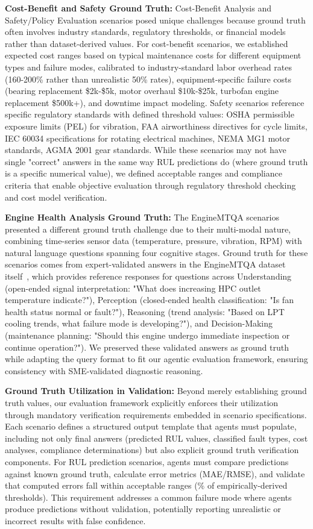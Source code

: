 \documentclass[sigconf]{acmart}
\begin{document}
\textbf{Cost-Benefit and Safety Ground Truth:} Cost-Benefit Analysis and Safety/Policy Evaluation scenarios posed unique challenges because ground truth often involves industry standards, regulatory thresholds, or financial models rather than dataset-derived values. For cost-benefit scenarios, we established expected cost ranges based on typical maintenance costs for different equipment types and failure modes, calibrated to industry-standard labor overhead rates (160-200\% rather than unrealistic 50\% rates), equipment-specific failure costs (bearing replacement \$2k-\$5k, motor overhaul \$10k-\$25k, turbofan engine replacement \$500k+), and downtime impact modeling. Safety scenarios reference specific regulatory standards with defined threshold values: OSHA permissible exposure limits (PEL) for vibration, FAA airworthiness directives for cycle limits, IEC 60034 specifications for rotating electrical machines, NEMA MG1 motor standards, AGMA 2001 gear standards. While these scenarios may not have single "correct" answers in the same way RUL predictions do (where ground truth is a specific numerical value), we defined acceptable ranges and compliance criteria that enable objective evaluation through regulatory threshold checking and cost model verification.

\textbf{Engine Health Analysis Ground Truth:} The EngineMTQA scenarios presented a different ground truth challenge due to their multi-modal nature, combining time-series sensor data (temperature, pressure, vibration, RPM) with natural language questions spanning four cognitive stages. Ground truth for these scenarios comes from expert-validated answers in the EngineMTQA dataset itself~\cite{lei2024itformer}, which provides reference responses for questions across Understanding (open-ended signal interpretation: "What does increasing HPC outlet temperature indicate?"), Perception (closed-ended health classification: "Is fan health status normal or fault?"), Reasoning (trend analysis: "Based on LPT cooling trends, what failure mode is developing?"), and Decision-Making (maintenance planning: "Should this engine undergo immediate inspection or continue operation?"). We preserved these validated answers as ground truth while adapting the query format to fit our agentic evaluation framework, ensuring consistency with SME-validated diagnostic reasoning.

\textbf{Ground Truth Utilization in Validation:} Beyond merely establishing ground truth values, our evaluation framework explicitly enforces their utilization through mandatory verification requirements embedded in scenario specifications. Each scenario defines a structured output template that agents must populate, including not only final answers (predicted RUL values, classified fault types, cost analyses, compliance determinations) but also explicit ground truth verification components. For RUL prediction scenarios, agents must compare predictions against known ground truth, calculate error metrics (MAE/RMSE), and validate that computed errors fall within acceptable ranges (\% of empirically-derived thresholds). This requirement addresses a common failure mode where agents produce predictions without validation, potentially reporting unrealistic or incorrect results with false confidence.
\end{document}
